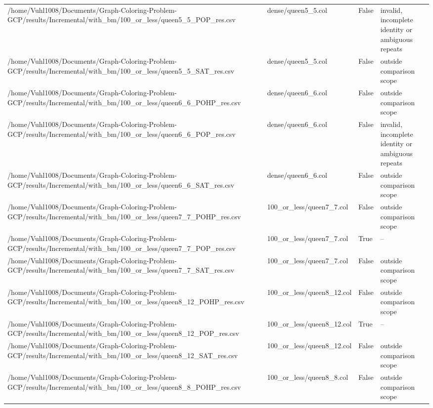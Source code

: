 \begin{table}[htbp]
\begin{tabular}{llll}
/home/Vuhl1008/Documents/Graph-Coloring-Problem-GCP/results/Incremental/with\_bm/100\_or\_less/queen5\_5\_POP\_res.csv & dense/queen5\_5.col & False & invalid, incomplete identity or ambiguous repeats \\
/home/Vuhl1008/Documents/Graph-Coloring-Problem-GCP/results/Incremental/with\_bm/100\_or\_less/queen5\_5\_SAT\_res.csv & dense/queen5\_5.col & False & outside comparison scope \\
/home/Vuhl1008/Documents/Graph-Coloring-Problem-GCP/results/Incremental/with\_bm/100\_or\_less/queen6\_6\_POHP\_res.csv & dense/queen6\_6.col & False & outside comparison scope \\
/home/Vuhl1008/Documents/Graph-Coloring-Problem-GCP/results/Incremental/with\_bm/100\_or\_less/queen6\_6\_POP\_res.csv & dense/queen6\_6.col & False & invalid, incomplete identity or ambiguous repeats \\
/home/Vuhl1008/Documents/Graph-Coloring-Problem-GCP/results/Incremental/with\_bm/100\_or\_less/queen6\_6\_SAT\_res.csv & dense/queen6\_6.col & False & outside comparison scope \\
/home/Vuhl1008/Documents/Graph-Coloring-Problem-GCP/results/Incremental/with\_bm/100\_or\_less/queen7\_7\_POHP\_res.csv & 100\_or\_less/queen7\_7.col & False & outside comparison scope \\
/home/Vuhl1008/Documents/Graph-Coloring-Problem-GCP/results/Incremental/with\_bm/100\_or\_less/queen7\_7\_POP\_res.csv & 100\_or\_less/queen7\_7.col & True & -- \\
/home/Vuhl1008/Documents/Graph-Coloring-Problem-GCP/results/Incremental/with\_bm/100\_or\_less/queen7\_7\_SAT\_res.csv & 100\_or\_less/queen7\_7.col & False & outside comparison scope \\
/home/Vuhl1008/Documents/Graph-Coloring-Problem-GCP/results/Incremental/with\_bm/100\_or\_less/queen8\_12\_POHP\_res.csv & 100\_or\_less/queen8\_12.col & False & outside comparison scope \\
/home/Vuhl1008/Documents/Graph-Coloring-Problem-GCP/results/Incremental/with\_bm/100\_or\_less/queen8\_12\_POP\_res.csv & 100\_or\_less/queen8\_12.col & True & -- \\
/home/Vuhl1008/Documents/Graph-Coloring-Problem-GCP/results/Incremental/with\_bm/100\_or\_less/queen8\_12\_SAT\_res.csv & 100\_or\_less/queen8\_12.col & False & outside comparison scope \\
/home/Vuhl1008/Documents/Graph-Coloring-Problem-GCP/results/Incremental/with\_bm/100\_or\_less/queen8\_8\_POHP\_res.csv & 100\_or\_less/queen8\_8.col & False & outside comparison scope \\

\end{tabular}
\end{table}
